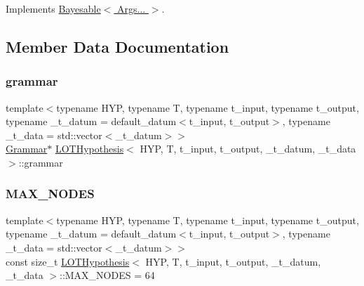Implements \hyperlink{class_bayesable_a2ec58e98bf37a90ac3d45a7713c6d5ea}{Bayesable$<$ Args... $>$}.



\subsection{Member Data Documentation}
\mbox{\label{class_l_o_t_hypothesis_aa7cf638b5d680794e33aa5eb4bd36b09}} 
\subsubsection{\texorpdfstring{grammar}{grammar}}
{\footnotesize\ttfamily template$<$typename H\+YP, typename T, typename t\+\_\+input, typename t\+\_\+output, typename \+\_\+t\+\_\+datum = default\+\_\+datum$<$t\+\_\+input, t\+\_\+output$>$, typename \+\_\+t\+\_\+data = std\+::vector$<$\+\_\+t\+\_\+datum$>$$>$ \\
\hyperlink{class_grammar}{Grammar}$\ast$ \hyperlink{class_l_o_t_hypothesis}{L\+O\+T\+Hypothesis}$<$ H\+YP, T, t\+\_\+input, t\+\_\+output, \+\_\+t\+\_\+datum, \+\_\+t\+\_\+data $>$\+::grammar}

\mbox{\label{class_l_o_t_hypothesis_ab262eb592887136a986f5b2649397eca}} 
\subsubsection{\texorpdfstring{M\+A\+X\+\_\+\+N\+O\+D\+ES}{MAX\_NODES}}
{\footnotesize\ttfamily template$<$typename H\+YP, typename T, typename t\+\_\+input, typename t\+\_\+output, typename \+\_\+t\+\_\+datum = default\+\_\+datum$<$t\+\_\+input, t\+\_\+output$>$, typename \+\_\+t\+\_\+data = std\+::vector$<$\+\_\+t\+\_\+datum$>$$>$ \\
const size\+\_\+t \hyperlink{class_l_o_t_hypothesis}{L\+O\+T\+Hypothesis}$<$ H\+YP, T, t\+\_\+input, t\+\_\+output, \+\_\+t\+\_\+datum, \+\_\+t\+\_\+data $>$\+::M\+A\+X\+\_\+\+N\+O\+D\+ES = 64\hspace{0.3cm}{\ttfamily [static]}}


